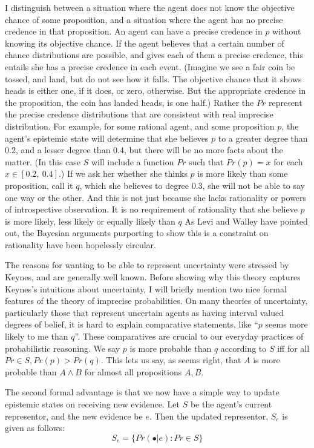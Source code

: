 I distinguish between a situation where the agent does not know the objective chance of some proposition, and a situation where the agent has no precise credence in that proposition. An agent can have a precise credence in \(p\) without knowing its objective chance. If the agent believes that a certain number of chance distributions are possible, and gives each of them a precise credence, this entails she has a precise credence in each event. (Imagine we see a fair coin be tossed, and land, but do not see how it falls. The objective chance that it shows heads is either one, if it does, or zero, otherwise. But the appropriate credence in the proposition, the coin has landed heads, is one half.) Rather the \(Pr\) represent the precise credence distributions that are consistent with real imprecise distribution. For example, for some rational agent, and some proposition \(p\), the agent's epistemic state will determine that she believes \(p\) to a greater degree than 0.2, and a lesser degree than 0.4, but there will be no more facts about the matter. (In this case \(S\) will include a function \(Pr\) such that \(Pr(p) = x\) for each \(x \in [0.2,~0.4]\).) If we ask her whether she thinks \(p\) is more likely than some proposition, call it \(q\), which she believes to degree 0.3, she will not be able to say one way or the other. And this is not just because she lacks rationality or powers of introspective observation. It is no requirement of rationality that she believe \(p\) is more likely, less likely or equally likely than \(q\) As Levi and Walley have pointed out, the Bayesian arguments purporting to show this is a constraint on rationality have been hopelessly circular.

The reasons for wanting to be able to represent uncertainty were stressed by Keynes, and are generally well known. Before showing why this theory captures Keynes's intuitions about uncertainty, I will briefly mention two nice formal features of the theory of imprecise probabilities. On many theories of uncertainty, particularly those that represent uncertain agents as having interval valued degrees of belief, it is hard to explain comparative statements, like ``\(p\) seems more likely to me than \(q\)''. These comparatives are crucial to our everyday practices of probabilistic reasoning. We say \(p\) is more probable than \(q\) according to \(S\) iff for all \(Pr \in S, Pr(p) > Pr(q)\). This lets us say, as seems right, that \(A\) is more probable than \(A \wedge B\) for almost all propositions \(A, B\).

The second formal advantage is that we now have a simple way to update epistemic states on receiving new evidence. Let \(S\) be the agent's current representor, and the new evidence be \(e\). Then the updated representor, \(S_e\) is given as follows:
\begin{equation}
S_e = \{Pr(\bullet | e): Pr \in S\}
\end{equation}

